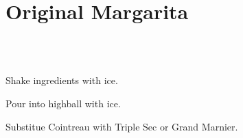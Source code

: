 \section[Original Margarita]{Original Margarita~\vegan}


\begin{recipestats}[
	servings=1,
	preptime=5 \minute,
	source=\citefield{cointreauMargarita}{shorttitle}\cite{cointreauMargarita},
]
\end{recipestats}


\begin{ingredientcolumns}[1]
	\begin{ingredientblock}
		\\
		\\
	\end{ingredientblock}
\end{ingredientcolumns}


\begin{preparation}
\item Shake ingredients with ice.
\item Pour into highball with ice.
\end{preparation}


\begin{variation}
\item Substitue Cointreau with Triple Sec or Grand Marnier.
\end{variation}


\recipeend
